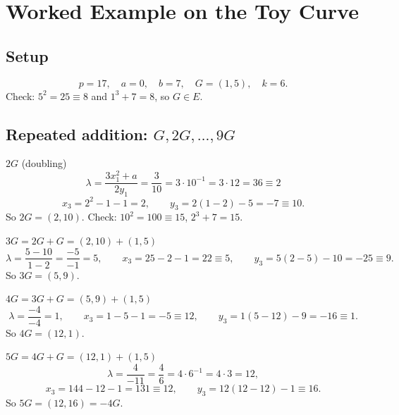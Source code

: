 \section{Worked Example on the Toy Curve}
\label{sec:worked}


\subsection{Setup}

\[
  p = 17, \quad a = 0, \quad b = 7, \quad G = (1, 5), \quad k = 6 .
\]
Check: $5^2 = 25 \equiv 8$ and $1^3 + 7 = 8$, so $G \in E$. \checkmark

\subsection{Repeated addition: $G, 2G, \ldots, 9G$}

\begin{framedex}[label={ex:2G}]{$2G$ (doubling)}
  \[
    \lambda = \frac{3 x_1^2 + a}{2 y_1} = \frac{3}{10} = 3 \cdot 10^{-1} = 3 \cdot 12 = 36 \equiv 2
  \]
  \[
    x_3 = 2^2 - 1 - 1 = 2, \qquad y_3 = 2(1 - 2) - 5 = -7 \equiv 10 .
  \]
  So $2G = (2, 10)$. Check: $10^2 = 100 \equiv 15$, $2^3 + 7 = 15$. \checkmark
\end{framedex}

\begin{framedex}{$3G = 2G + G = (2,10) + (1,5)$}
  \[
    \lambda = \frac{5 - 10}{1 - 2} = \frac{-5}{-1} = 5, \qquad
    x_3 = 25 - 2 - 1 = 22 \equiv 5, \qquad
    y_3 = 5(2 - 5) - 10 = -25 \equiv 9 .
  \]
  So $3G = (5, 9)$.
\end{framedex}

\begin{framedex}{$4G = 3G + G = (5,9) + (1,5)$}
  \[
    \lambda = \frac{-4}{-4} = 1, \qquad
    x_3 = 1 - 5 - 1 = -5 \equiv 12, \qquad
    y_3 = 1(5 - 12) - 9 = -16 \equiv 1 .
  \]
  So $4G = (12, 1)$.
\end{framedex}

\begin{framedex}{$5G = 4G + G = (12,1) + (1,5)$}
  \[
    \lambda = \frac{4}{-11} = \frac{4}{6} = 4 \cdot 6^{-1} = 4 \cdot 3 = 12,
  \]
  \[
    x_3 = 144 - 12 - 1 = 131 \equiv 12, \qquad
    y_3 = 12(12 - 12) - 1 \equiv 16 .
  \]
  So $5G = (12, 16) = -4G$.
\end{framedex}

